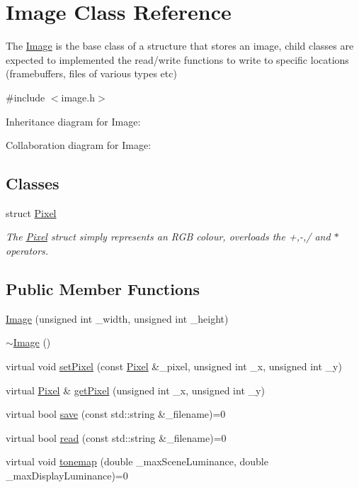 \hypertarget{classImage}{}\section{Image Class Reference}
\label{classImage}


The \hyperlink{classImage}{Image} is the base class of a structure that stores an image, child classes are expected to implemented the read/write functions to write to specific locations (framebuffers, files of various types etc)  




{\ttfamily \#include $<$image.\+h$>$}



Inheritance diagram for Image\+:


Collaboration diagram for Image\+:
\subsection*{Classes}
\begin{DoxyCompactItemize}
\item 
struct \hyperlink{structImage_1_1Pixel}{Pixel}
\begin{DoxyCompactList}\small\item\em The \hyperlink{structImage_1_1Pixel}{Pixel} struct simply represents an R\+G\+B colour, overloads the +,-\/,/ and $\ast$ operators. \end{DoxyCompactList}\end{DoxyCompactItemize}
\subsection*{Public Member Functions}
\begin{DoxyCompactItemize}
\item 
\hyperlink{classImage_a055c8145be6f8c3da429f73da47c7163}{Image} (unsigned int \+\_\+width, unsigned int \+\_\+height)
\item 
\hyperlink{classImage_a0294f63700543e11c0f0da85601c7ae5}{$\sim$\+Image} ()
\item 
virtual void \hyperlink{classImage_a704672fded047d7f142c6e6dd8c488f8}{set\+Pixel} (const \hyperlink{structImage_1_1Pixel}{Pixel} \&\+\_\+pixel, unsigned int \+\_\+x, unsigned int \+\_\+y)
\item 
virtual \hyperlink{structImage_1_1Pixel}{Pixel} \& \hyperlink{classImage_a634f5e4de7751158cfc2312c93a9a005}{get\+Pixel} (unsigned int \+\_\+x, unsigned int \+\_\+y)
\item 
virtual bool \hyperlink{classImage_abccefaaa9c3b1c9edb57f19d7c7777c3}{save} (const std\+::string \&\+\_\+filename)=0
\item 
virtual bool \hyperlink{classImage_aaad771ed7e29b7f01f2f129f84224060}{read} (const std\+::string \&\+\_\+filename)=0
\item 
virtual void \hyperlink{classImage_a614b4183dc55a0097007bb65bb76493f}{tonemap} (double \+\_\+max\+Scene\+Luminance, double \+\_\+max\+Display\+Luminance)=0
\end{DoxyCompactItemize}
